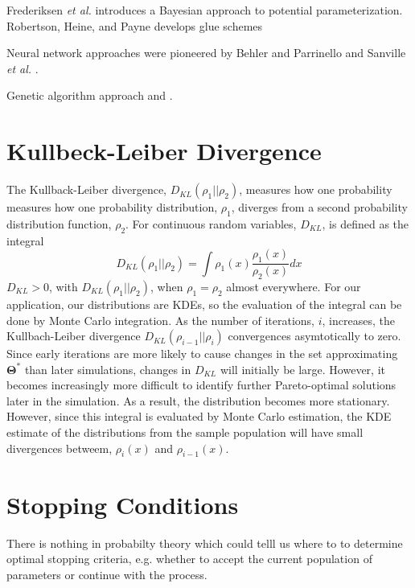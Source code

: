 Frederiksen \emph{et al.} \cite{fredericksen2004_bayesian_fitting} introduces a Bayesian approach to potential parameterization.
Robertson, Heine, and Payne \cite{robertson1993_glue_schemes} develops glue schemes

Neural network approaches were pioneered by Behler and Parrinello \cite{behler2007_NN_potdev} and Sanville \emph{et al.} \cite{sanville2008_NN_potdev_si}.

Genetic algorithm approach\cite{marques2008_ga_potdev} and \cite{hunger1998_ga_potdev}.
\section{Kullbeck-Leiber Divergence}

The Kullback-Leiber divergence\cite{kullback1951_kld}, $D_{KL}(\rho_1\vert\vert\rho_2)$, measures how one probability measures how one probability distribution, $\rho_1$, diverges from a second probability distribution function, $\rho_2$.
For continuous random variables, $D_{KL}$, is defined as the integral
\begin{equation}
   D_{KL}(\rho_1\vert\vert\rho_2)=\int \rho_1(x) \frac{\rho_1(x)}{\rho_2(x)}dx
\end{equation}
$D_{KL} > 0$, with $D_{KL}(\rho_1\vert\vert\rho_2)$, when $\rho_1=\rho_2$ almost everywhere.
For our application, our distributions are KDEs, so the evaluation of the integral can be done by Monte Carlo integration.
As the number of iterations, $i$, increases, the Kullbach-Leiber divergence $D_{KL}(\rho_{i-1}\vert\vert\rho_i)$ convergences asymtotically to zero.
Since early iterations are more likely to cause changes in the set approximating $\bm{\Theta}^*$ than later simulations, changes in $D_{KL}$ will initially be large.
However, it becomes increasingly more difficult to identify further Pareto-optimal solutions later in the simulation.
As a result, the distribution becomes more stationary.
However, since this integral is evaluated by Monte Carlo estimation, the KDE estimate of the distributions from the sample population will have small divergences betweem, $\rho_i(x)$ and $\rho_{i-1}(x)$.

\section{Stopping Conditions}

There is nothing in probabilty theory which could telll us where to to determine optimal stopping criteria, e.g. whether to accept the current population of parameters or continue with the process.

